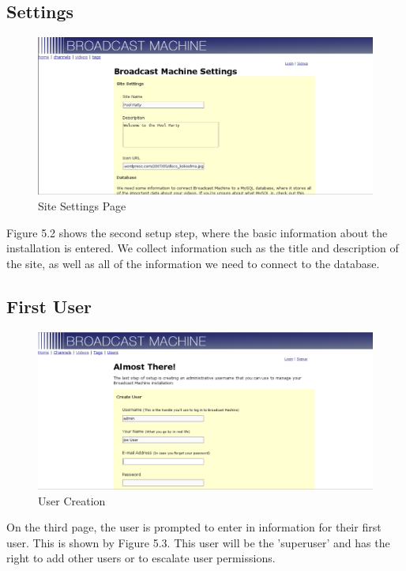 \documentclass[a4paper,12pt]{report}
\begin{document}
\subsection{Settings}
\begin{figure}[htp]
\begin{center}
\includegraphics[width=150mm]{./images/setup2.png}
\caption{Site Settings Page}
\end{center}
\end{figure}

Figure 5.2 shows the second setup step, where the basic information about the installation is entered.
We collect information such as the title and description of the site, as well as all of the information we need to connect to the database.

\subsection{First User}
\begin{figure}[htp]
\begin{center}
\includegraphics[width=150mm]{./images/setup3.png}
\caption{User Creation}
\end{center}
\end{figure}
On the third page, the user is prompted to enter in information for their first user. This is shown by Figure 5.3.
This user will be the 'superuser' and has the right to add other users or to escalate user permissions.
\end{document}
